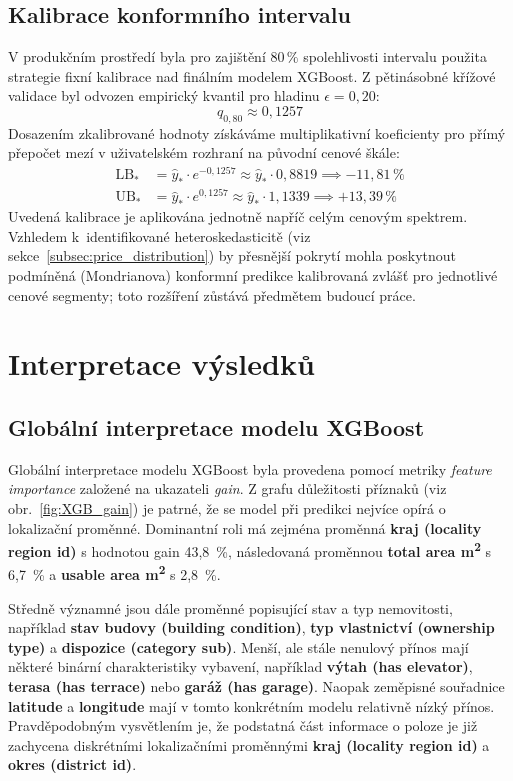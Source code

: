 \subsection{Kalibrace konformního intervalu}
\label{sec:model_calibration}
V produkčním prostředí byla pro zajištění $80\,\%$ spolehlivosti intervalu použita strategie fixní kalibrace nad finálním modelem XGBoost. Z pětinásobné křížové validace byl odvozen empirický kvantil pro hladinu $\epsilon = 0{,}20$:
\[
    q_{0{,}80} \approx 0{,}1257
\]
Dosazením zkalibrované hodnoty získáváme multiplikativní koeficienty pro přímý přepočet mezí v uživatelském rozhraní na původní cenové škále:
\begin{align*}
    \mathrm{LB}_* &= \hat{y}_* \cdot e^{-0{,}1257} \approx \hat{y}_* \cdot 0{,}8819 \implies -11{,}81\,\% \\
    \mathrm{UB}_* &= \hat{y}_* \cdot e^{0{,}1257} \approx \hat{y}_* \cdot 1{,}1339 \implies +13{,}39\,\%
\end{align*}
Uvedená kalibrace je aplikována jednotně napříč celým cenovým spektrem. Vzhledem k~identifikované heteroskedasticitě (viz sekce~\ref{subsec:price_distribution}) by přesnější pokrytí mohla poskytnout podmíněná (Mondrianova) konformní predikce kalibrovaná zvlášť pro jednotlivé cenové segmenty; toto rozšíření zůstává předmětem budoucí práce.

\section{Interpretace výsledků}

\subsection{Globální interpretace modelu XGBoost}

Globální interpretace modelu XGBoost byla provedena pomocí metriky \textit{feature importance} založené na ukazateli \textit{gain}. Z grafu důležitosti příznaků (viz obr.~\ref{fig:XGB_gain}) je patrné, že se model při predikci nejvíce opírá o lokalizační proměnné. Dominantní roli má zejména proměnná \textbf{kraj (locality region id)} s hodnotou gain 43{,}8~\%, následovaná proměnnou \textbf{total area m\textsuperscript{2}} s 6{,}7~\% a \textbf{usable area m\textsuperscript{2}} s 2{,}8~\%.

Středně významné jsou dále proměnné popisující stav a typ nemovitosti, například \textbf{stav budovy (building condition)}, \textbf{typ vlastnictví (ownership type)} a \textbf{dispozice (category sub)}. Menší, ale stále nenulový přínos mají některé binární charakteristiky vybavení, například \textbf{výtah (has elevator)}, \textbf{terasa (has terrace)} nebo \textbf{garáž (has garage)}. Naopak zeměpisné souřadnice \textbf{latitude} a \textbf{longitude} mají v tomto konkrétním modelu relativně nízký přínos. Pravděpodobným vysvětlením je, že podstatná část informace o poloze je již zachycena diskrétními lokalizačními proměnnými \textbf{kraj (locality region id)} a \textbf{okres (district id)}.

